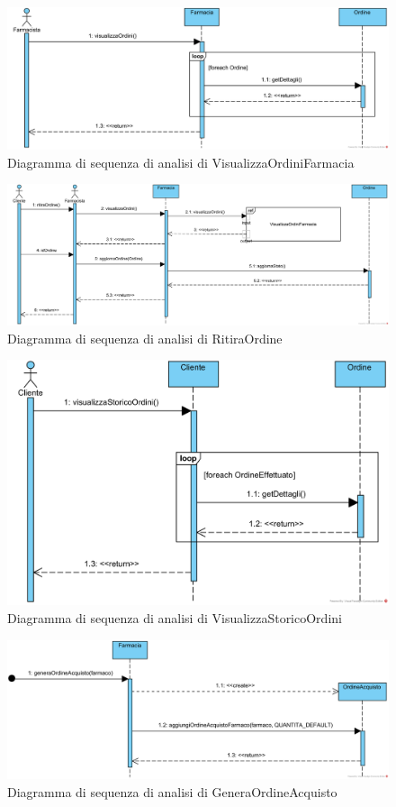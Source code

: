 \begin{figure}[!hbp]
	\centering
	\includegraphics[width=0.9\linewidth]{assets/sequence_analisi/SequenceAnalisiVisualizzaOrdiniFarmacia.png}
	\caption{Diagramma di sequenza di analisi di VisualizzaOrdiniFarmacia}
\end{figure}

\begin{figure}[!hbp]
	\centering
	\includegraphics[width=0.8\linewidth]{assets/sequence_analisi/SequenceAnalisiRitiraOrdine.png}
	\caption{Diagramma di sequenza di analisi di RitiraOrdine}
\end{figure}

\begin{figure}[!hbp]
	\centering
	\includegraphics[width=0.8\linewidth]{assets/sequence_analisi/SequenceAnalisiVisualizzaStoricoOrdini.png}
	\caption{Diagramma di sequenza di analisi di VisualizzaStoricoOrdini}
\end{figure}

\begin{figure}[!hbp]
	\centering
	\includegraphics[width=0.8\linewidth]{assets/sequence_analisi/SequenceAnalisiGeneraOrdineAcquisto.png}
	\caption{Diagramma di sequenza di analisi di GeneraOrdineAcquisto}
\end{figure}

